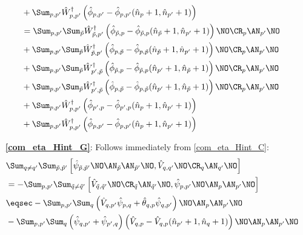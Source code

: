 \begin{appendix}
\begin{itemize}
\begin{align}
&+\Sum_{p, p^\prime}\hat W_{p,p^\prime}^\dagger \left(\hat\phi_{ p, p^\prime}-\hat\phi_{ p, p^\prime}(\hat n_p+1,\hat n_{p^\prime}+1)\right)\nonumber\\
&= \Sum_{p, p^\prime}\Sum_{\tilde p}\hat W_{\tilde p,p^\prime}^\dagger \left(\hat\phi_{ \tilde p,p}-\hat\phi_{ \tilde p,p}(\hat n_{\tilde p}+1,\hat n_{p^\prime}+1)\right)\NO\CR_{p}\AN_{p^\prime}\NO \\
&+\Sum_{p, p^\prime}\Sum_{\tilde p}\hat W_{\tilde p,p^\prime}^\dagger \left(\hat\phi_{p,\tilde p}-\hat\phi_{p,\tilde p}(\hat n_{\tilde p}+1,\hat n_{p^\prime}+1)\right)\NO\CR_{p}\AN_{p^\prime}\NO \nonumber\\
&+\Sum_{p, p^\prime}\Sum_{\tilde p}\hat W_{p^\prime,\tilde p}^\dagger \left(\hat\phi_{\tilde p,p}-\hat\phi_{\tilde p,p}(\hat n_{p^\prime}+1,\hat n_{\tilde p}+1)\right)\NO\CR_{p}\AN_{p^\prime}\NO \nonumber\\
&+\Sum_{p, p^\prime}\Sum_{\tilde p}\hat W_{p^\prime,\tilde p}^\dagger \left(\hat\phi_{p, \tilde p}-\hat\phi_{p, \tilde p}(\hat n_{p^\prime}+1,\hat n_{\tilde p}+1)\right)\NO\CR_{p}\AN_{p^\prime}\NO \nonumber\\
&+\Sum_{p, p^\prime}\hat W_{p,p^\prime}^\dagger \left(\hat\phi_{p^\prime,p}-\hat\phi_{p^\prime,p}(\hat n_p+1,\hat n_{p^\prime}+1)\right) \nonumber\\
&+\Sum_{p, p^\prime}\hat W_{p,p^\prime}^\dagger \left(\hat\phi_{ p, p^\prime}-\hat\phi_{ p, p^\prime}(\hat n_p+1,\hat n_{p^\prime}+1)\right)\nonumber
\end{align}
\item[\textbf{\ref{com_eta_Hint_G}}:] Follows immediately from \ref{com_eta_Hint_C}:
\begin{subequations}
\begin{align}
&\Sum_{q\neq q^\prime}\Sum_{\tilde p,\tilde p^\prime} \left[\hat\psi_{\tilde p,\tilde p^\prime}\NO\AN_{\tilde p}\AN_{\tilde p^\prime}\NO,\hat V_{q,q^\prime}\NO\CR_q\AN_{q^\prime}\NO\right]\nonumber\\
&=-\Sum_{p,p^\prime} \Sum_{\tilde q\neq \tilde q^\prime}\left[\hat V_{\tilde q,\tilde q^\prime}\NO\CR_{\tilde q}\AN_{\tilde q^\prime}\NO,\hat\psi_{p,p^\prime}\NO\AN_{p}\AN_{p^\prime}\NO\right]\nonumber\\
&\eqsec -\Sum_{p, p^\prime}\Sum_{q}\left(\hat V_{ q, p^\prime}\hat \psi_{p,q}+\hat\theta_{ q, p}\hat \psi_{q,p^\prime}\right)\NO\AN_{p}\AN_{p^\prime}\NO\\
&-\Sum_{p, p^\prime}\Sum_{q}\left(\hat \psi_{q,p^\prime}+\hat \psi_{p^\prime,q}\right) \left(\hat V_{ q,p}-\hat V_{ q,p}(\hat n_{p^\prime}+1,\hat n_{q}+1)\right)\NO\AN_{p}\AN_{p^\prime}\NO\nonumber

\end{align}
\end{subequations}
\end{itemize}
\end{appendix}
